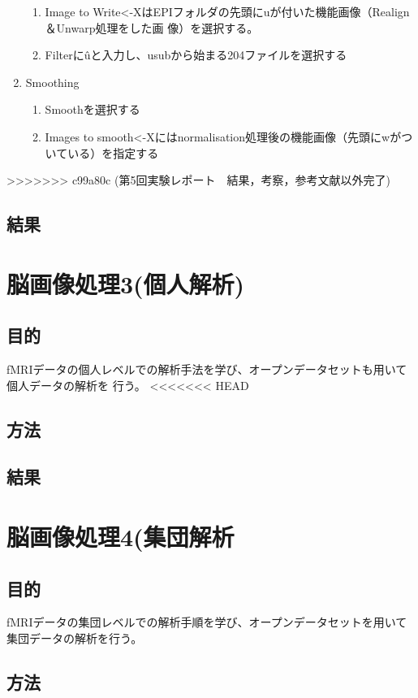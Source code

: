 \documentclass{jlreq}
\begin{document}
\begin{enumerate}
\begin{enumerate}
        \item Image to Write<-XはEPIフォルダの先頭にuが付いた機能画像（Realign＆Unwarp処理をした画
        像）を選択する。
        \item Filterに\^uと入力し、usubから始まる204ファイルを選択する
        \end{enumerate}
    \item Smoothing
    \begin{enumerate}
        \item Smoothを選択する
        \item Images to smooth<-Xにはnormalisation処理後の機能画像（先頭にwがついている）を指定する  \end{enumerate}
\end{enumerate}
>>>>>>> c99a80c (第5回実験レポート　結果，考察，参考文献以外完了)
\subsection{結果}

\section{脳画像処理3(個人解析)}
\subsection{目的}
fMRIデータの個人レベルでの解析手法を学び、オープンデータセットも用いて個人データの解析を
行う。
<<<<<<< HEAD
\subsection{方法}

\subsection{結果}

\section{脳画像処理4(集団解析}
\subsection{目的}
fMRIデータの集団レベルでの解析手順を学び、オープンデータセットを用いて集団データの解析を行う。

\subsection{方法}
\end{document}
